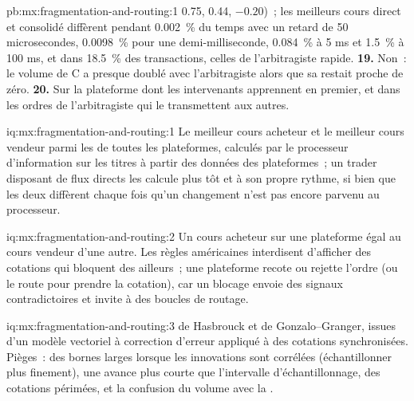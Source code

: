\begin{solution}{pb:mx:fragmentation-and-routing:1}
0.75, 0.44, $-0.20$)~; les meilleurs cours direct et consolidé diffèrent pendant 0.002~\% du temps avec un retard de 50 microsecondes, 0.0098~\% pour une demi-milliseconde,
0.084~\% à 5 ms et 1.5~\% à 100 ms, et dans 18.5~\% des transactions, celles de l'arbitragiste rapide.
\textbf{19.} Non~: le volume de C a presque doublé avec l'arbitragiste alors que sa  restait proche de zéro.
\textbf{20.} Sur la plateforme dont les intervenants apprennent en premier, et dans les ordres de l'arbitragiste qui le transmettent aux autres.
\end{solution}

\begin{solution}{iq:mx:fragmentation-and-routing:1}
Le meilleur cours acheteur et le meilleur cours vendeur parmi les  de toutes les plateformes, calculés par le processeur d'information sur les titres à partir des données des plateformes~; un trader
disposant de flux directs les calcule plus tôt et à son propre rythme, si bien que les deux diffèrent chaque fois qu'un changement n'est pas encore parvenu au processeur.
\end{solution}

\begin{solution}{iq:mx:fragmentation-and-routing:2}
Un cours acheteur sur une plateforme égal au cours vendeur d'une autre. Les règles américaines interdisent d'afficher des cotations qui bloquent des  ailleurs~; une plateforme recote ou rejette
l'ordre (ou le route pour prendre la cotation), car un blocage envoie des signaux contradictoires et invite à des boucles de routage.
\end{solution}

\begin{solution}{iq:mx:fragmentation-and-routing:3}
 de Hasbrouck et  de Gonzalo--Granger, issues d'un modèle vectoriel à correction d'erreur appliqué à des cotations synchronisées. Pièges~: des bornes larges
lorsque les innovations sont corrélées (échantillonner plus finement), une avance plus courte que l'intervalle d'échantillonnage, des cotations périmées, et la confusion du volume avec la .
\end{solution}


